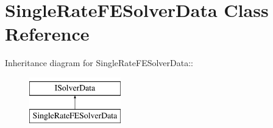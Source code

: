 \hypertarget{classSingleRateFESolverData}{
\section{SingleRateFESolverData Class Reference}
\label{classSingleRateFESolverData}
}
Inheritance diagram for SingleRateFESolverData::\begin{figure}[H]
\begin{center}
\leavevmode
\includegraphics[height=2cm]{classSingleRateFESolverData}
\end{center}
\end{figure}
